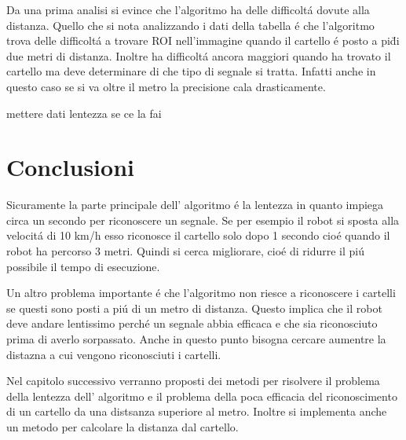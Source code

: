     Da una prima analisi si evince che l'algoritmo ha delle difficolt\'a dovute alla distanza. Quello che si nota analizzando i dati della tabella \'e che l'algoritmo trova delle difficolt\'a a trovare ROI nell'immagine quando il cartello \'e posto a pi\u di due metri di distanza. Inoltre ha difficolt\'a ancora maggiori quando ha trovato il cartello ma deve determinare di che tipo di segnale si tratta. Infatti anche in questo caso se si va oltre il metro la precisione cala drasticamente.

    mettere dati lentezza se ce la fai

\section{Conclusioni}

	Sicuramente la parte principale  dell' algoritmo \'e la lentezza in quanto impiega circa un secondo per riconoscere un segnale. Se per esempio il robot si sposta alla velocit\'a di 10 km/h esso riconosce il cartello solo dopo 1 secondo cio\'e quando il robot ha percorso 3 metri. Quindi si cerca migliorare, cio\'e di ridurre il pi\'u possibile il tempo di esecuzione.

	Un altro problema importante \'e che l'algoritmo non riesce a riconoscere i cartelli se questi sono posti a pi\'u di un metro di distanza. Questo implica che il robot deve andare lentissimo perch\'e un segnale abbia efficaca e che sia riconosciuto prima di averlo sorpassato. Anche in questo punto bisogna cercare aumentre la distazna a cui vengono riconosciuti i cartelli.
	
	Nel capitolo successivo verranno proposti dei metodi per risolvere il problema della lentezza dell' algoritmo e il problema della poca efficacia del riconoscimento di un cartello da una distsanza superiore al metro. Inoltre si implementa anche un metodo per calcolare la distanza dal cartello.

	


